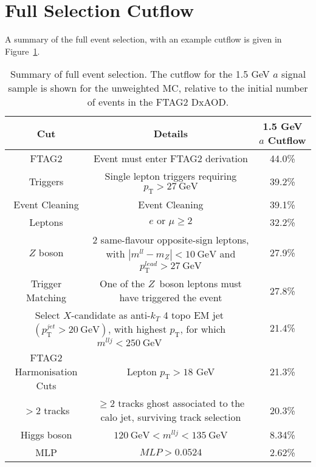 \documentclass[NOTE, atlasdraft=true, texlive=2017, UKenglish]{\ATLASLATEXPATH atlasdoc}
\begin{document}
\clearpage
\section{Full Selection Cutflow}
\label{app:cutflow}

A summary of the full event selection, with an example cutflow is given in Figure~\ref{tab:selectioncutflow}.

\begin{table}[!htbp]{\footnotesize\renewcommand{\arraystretch}{1.2}
    \begin{center}
      \begin{tabular}{|c|c|c|}
        \hline
        Cut & Details & 1.5 GeV $a$ Cutflow \\
        \hline
        FTAG2 & Event must enter \textsc{FTAG2} derivation & 44.0\% \\ %
        Triggers & Single lepton triggers requiring $p_\text{T}>27\ \text{GeV}$ & 39.2\% \\ %
        Event Cleaning & Event Cleaning & 39.1\% \\ %
        Leptons & $e\text{ or }\mu\geq 2$ & 32.2\% \\ %
        $Z$ boson & 2 same-flavour opposite-sign leptons, with $|m^{ll}-m_Z|<10\ \text{GeV}$ and $p_\text{T}^{lead}>27\ \text{GeV}$ & 27.9\% \\ %
        Trigger Matching & One of the $Z$~boson leptons must have triggered the event & 27.8\% \\ %
        \hline
        \multicolumn{2}{|c|}{Select $X$-candidate as anti-$k_T$ 4 topo EM jet $(p_\text{T}^{jet}>20\ \text{GeV})$, with highest $p_\text{T}$, for which $m^{llj}<250\ \text{GeV}$} & 21.4\% \\ %
        \hline
        FTAG2 Harmonisation Cuts & Lepton $p_\text{T}>18$ GeV & 21.3\% \\ %
        $>2$ tracks & $\geq 2$ tracks ghost associated to the calo jet, surviving track selection & 20.3\% \\ %
        Higgs boson & $120\ \text{GeV}<m^{llj}<135\ \text{GeV}$ & 8.34\% \\ %
        MLP & $MLP>0.0524$ & 2.62\% \\ %
        \hline
      \end{tabular}
      \caption{Summary of full event selection. The cutflow for the 1.5 GeV $a$ signal sample is shown for the unweighted MC, relative to the initial number of events in the \textsc{FTAG2} DxAOD.}
      \label{tab:selectioncutflow}
  \end{center}}
\end{table}
\end{document}
